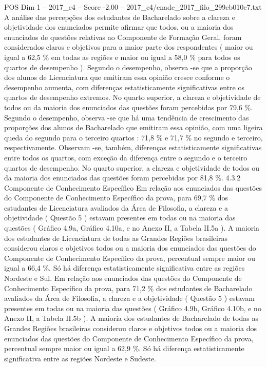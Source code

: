 \begin{textsample}{POS Dim 1 – 2017\_c4 – Score -2.00 – 2017\_c4/enade\_2017\_filo\_299cb010c7.txt}
A análise das percepções dos estudantes de Bacharelado sobre a clareza e objetividade dos enunciados permite afirmar que todos, ou a maioria dos enunciados de questões relativas ao Componente de Formação Geral, foram considerados claros e objetivos para a maior parte dos respondentes ( maior ou igual a 62,5 \% em todas as regiões e maior ou igual a 58,0 \% para todos os quartos de desempenho ).
Segundo o desempenho, observa -se que a proporção dos alunos de Licenciatura que emitiram essa opinião cresce conforme o desempenho aumenta, com diferenças estatisticamente significativas entre os quartos de desempenho extremos.
No quarto superior, a clareza e objetividade de todos ou da maioria dos enunciados das questões foram percebidas por 79,6 \%.
Segundo o desempenho, observa -se que há uma tendência de crescimento das proporções dos alunos de Bacharelado que emitiram essa opinião, com uma ligeira queda do segundo para o terceiro quartos : 71,8 \% e 71,7 \% no segundo e terceiro, respectivamente.
Observam -se, também, diferenças estatisticamente significativas entre todos os quartos, com exceção da diferença entre o segundo e o terceiro quartos de desempenho.
No quarto superior, a clareza e objetividade de todos ou da maioria dos enunciados das questões foram percebidas por 81,8 \%. 4.3.2 Componente de Conhecimento Específico Em relação aos enunciados das questões do Componente de Conhecimento Específico da prova, para 69,7 \% dos estudantes de Licenciatura avaliados da Área de Filosofia, a clareza e a objetividade ( Questão 5 ) estavam presentes em todas ou na maioria das questões ( Gráfico 4.9a, Gráfico 4.10a, e no Anexo II, a Tabela II.5a ).
A maioria dos estudantes de Licenciatura de todas as Grandes Regiões brasileiras considerou claros e objetivos todos ou a maioria dos enunciados das questões do Componente de Conhecimento Específico da prova, percentual sempre maior ou igual a 66,4 \%.
Só há diferença estatisticamente significativa entre as regiões Nordeste e Sul.
Em relação aos enunciados das questões do Componente de Conhecimento Específico da prova, para 71,2 \% dos estudantes de Bacharelado avaliados da Área de Filosofia, a clareza e a objetividade ( Questão 5 ) estavam presentes em todas ou na maioria das questões ( Gráfico 4.9b, Gráfico 4.10b, e no Anexo II, a Tabela II.5b ).
A maioria dos estudantes de Bacharelado de todas as Grandes Regiões brasileiras considerou claros e objetivos todos ou a maioria dos enunciados das questões do Componente de Conhecimento Específico da prova, percentual sempre maior ou igual a 62,9 \%.
Só há diferença estatisticamente significativa entre as regiões Nordeste e Sudeste.

\end{textsample}
